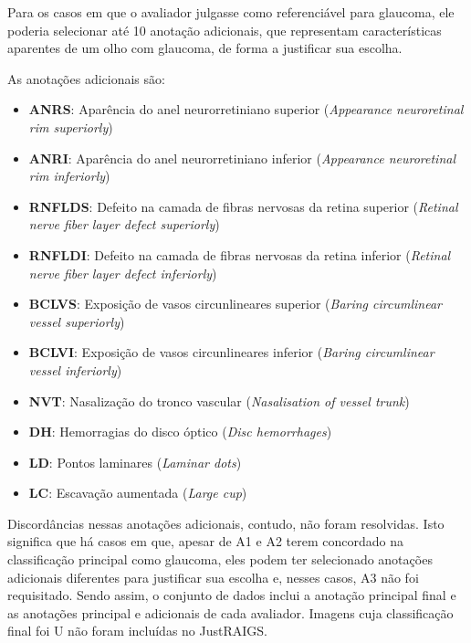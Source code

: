 \documentclass[12pt]{article}
\begin{document}
Para os casos em que o avaliador julgasse como referenciável para glaucoma, ele poderia selecionar até 10 anotação adicionais, que representam características aparentes de um olho com glaucoma, de forma a justificar sua escolha. \cite{justraigs_article}

As anotações adicionais são:
\begin{itemize}
    \setlength\itemsep{0em}
    \item \textbf{ANRS}: Aparência do anel neurorretiniano superior (\emph{Appearance neuroretinal rim superiorly})
    \item \textbf{ANRI}: Aparência do anel neurorretiniano inferior (\emph{Appearance neuroretinal rim inferiorly})
    \item \textbf{RNFLDS}: Defeito na camada de fibras nervosas da retina superior (\emph{Retinal nerve fiber layer defect superiorly})
    \item \textbf{RNFLDI}: Defeito na camada de fibras nervosas da retina inferior (\emph{Retinal nerve fiber layer defect inferiorly})
    \item \textbf{BCLVS}: Exposição de vasos circunlineares superior (\emph{Baring circumlinear vessel superiorly})
    \item \textbf{BCLVI}: Exposição de vasos circunlineares inferior (\emph{Baring circumlinear vessel inferiorly})
    \item \textbf{NVT}: Nasalização do tronco vascular (\emph{Nasalisation of vessel trunk})
    \item \textbf{DH}: Hemorragias do disco óptico (\emph{Disc hemorrhages})
    \item \textbf{LD}: Pontos laminares (\emph{Laminar dots})
    \item \textbf{LC}: Escavação aumentada (\emph{Large cup})
\end{itemize}

Discordâncias nessas anotações adicionais, contudo, não foram resolvidas. Isto significa que há casos em que, apesar de A1 e A2 terem concordado na classificação principal como glaucoma, eles podem ter selecionado anotações adicionais diferentes para justificar sua escolha e, nesses casos, A3 não foi requisitado. Sendo assim, o conjunto de dados inclui a anotação principal final e as anotações principal e adicionais de cada avaliador. Imagens cuja classificação final foi U não foram incluídas no JustRAIGS.

\end{document}
